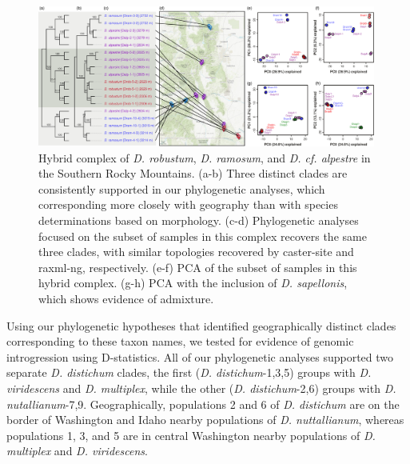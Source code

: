\documentclass[11pt]{article}
\begin{document}
\begin{figure}[t!]
	\centering
	  \includegraphics[width=0.99\textwidth]{./figures/ramosum-robustum-alpestre2}	
	\caption{
        Hybrid complex of \emph{D. robustum}, \emph{D. ramosum}, and \emph{D. cf. alpestre} in the Southern Rocky Mountains. 
        (a-b) Three distinct clades are consistently supported in our phylogenetic analyses, which corresponding more closely with geography than with species determinations based on morphology.
        (c-d) Phylogenetic analyses focused on the subset of samples in this complex
        recovers the same three clades, with similar topologies recovered by caster-site and raxml-ng, respectively.
        (e-f) PCA of the subset of samples in this hybrid complex.
        (g-h) PCA with the inclusion of \emph{D. sapellonis}, which shows evidence of admixture.        
	}
	\label{fig:robustum}
\end{figure}




Using our phylogenetic hypotheses that identified geographically distinct clades corresponding
to these taxon names, we tested for evidence of genomic introgression using D-statistics. 
All of our phylogenetic analyses supported two separate 
\emph{D. distichum} clades, the first (\emph{D. distichum}-1,3,5) groups with 
\emph{D. viridescens} and \emph{D. multiplex}, while the other 
(\emph{D. distichum}-2,6) groups with \emph{D. nutallianum}-7,9. 
Geographically, populations 2 and 6 of \emph{D. distichum} are on the border of 
Washington and Idaho nearby populations of \emph{D. nuttallianum}, whereas 
populations 1, 3, and 5 are in central Washington nearby populations of 
\emph{D. multiplex} and \emph{D. viridescens}. 
\end{document}
